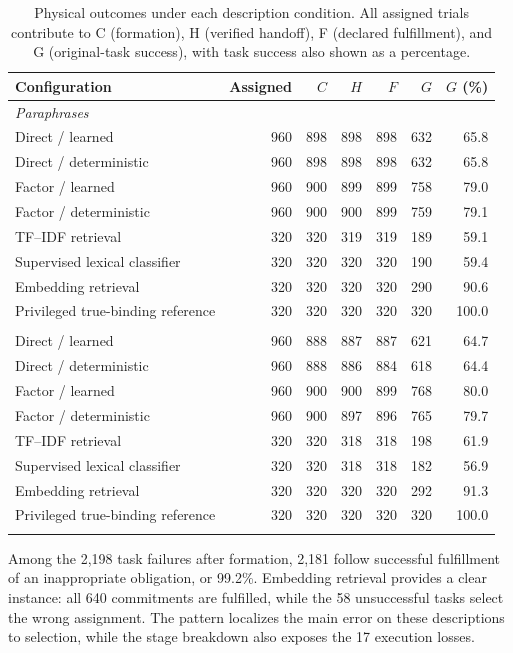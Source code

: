 \documentclass[sigconf,nonacm,balance=false]{aamas}
\newcommand{\tabstyle}{\small\setlength{\tabcolsep}{3pt}\renewcommand{\arraystretch}{1.10}}
\begin{document}
\begin{table}[!htbp]
\centering\tabstyle
\caption{Physical outcomes under each description condition. All assigned trials contribute to C (formation), H (verified handoff), F (declared fulfillment), and G (original-task success), with task success also shown as a percentage.}
\label{tab:online-quality}
\begin{tabular}{@{}lrrrrrr@{}}
\toprule
Configuration & Assigned & $C$ & $H$ & $F$ & $G$ & $G$ (\%)\\\midrule
\multicolumn{7}{l}{\textit{Paraphrases}}\\
Direct / learned & 960 & 898 & 898 & 898 & 632 & 65.8\\
Direct / deterministic & 960 & 898 & 898 & 898 & 632 & 65.8\\
Factor / learned & 960 & 900 & 899 & 899 & 758 & 79.0\\
Factor / deterministic & 960 & 900 & 900 & 899 & 759 & 79.1\\
TF--IDF retrieval & 320 & 320 & 319 & 319 & 189 & 59.1\\
Supervised lexical classifier & 320 & 320 & 320 & 320 & 190 & 59.4\\
Embedding retrieval & 320 & 320 & 320 & 320 & 290 & 90.6\\
Privileged true-binding reference & 320 & 320 & 320 & 320 & 320 & 100.0\\
\addlinespace
\multicolumn{7}{l}{\textit{With distractors}}\\
Direct / learned & 960 & 888 & 887 & 887 & 621 & 64.7\\
Direct / deterministic & 960 & 888 & 886 & 884 & 618 & 64.4\\
Factor / learned & 960 & 900 & 900 & 899 & 768 & 80.0\\
Factor / deterministic & 960 & 900 & 897 & 896 & 765 & 79.7\\
TF--IDF retrieval & 320 & 320 & 318 & 318 & 198 & 61.9\\
Supervised lexical classifier & 320 & 320 & 318 & 318 & 182 & 56.9\\
Embedding retrieval & 320 & 320 & 320 & 320 & 292 & 91.3\\
Privileged true-binding reference & 320 & 320 & 320 & 320 & 320 & 100.0\\
\addlinespace
\bottomrule\end{tabular}\end{table}

Among the 2,198 task failures after formation, 2,181 follow successful fulfillment of an inappropriate obligation, or 99.2\%. Embedding retrieval provides a clear instance: all 640 commitments are fulfilled, while the 58 unsuccessful tasks select the wrong assignment. The pattern localizes the main error on these descriptions to selection, while the stage breakdown also exposes the 17 execution losses.
\end{document}
